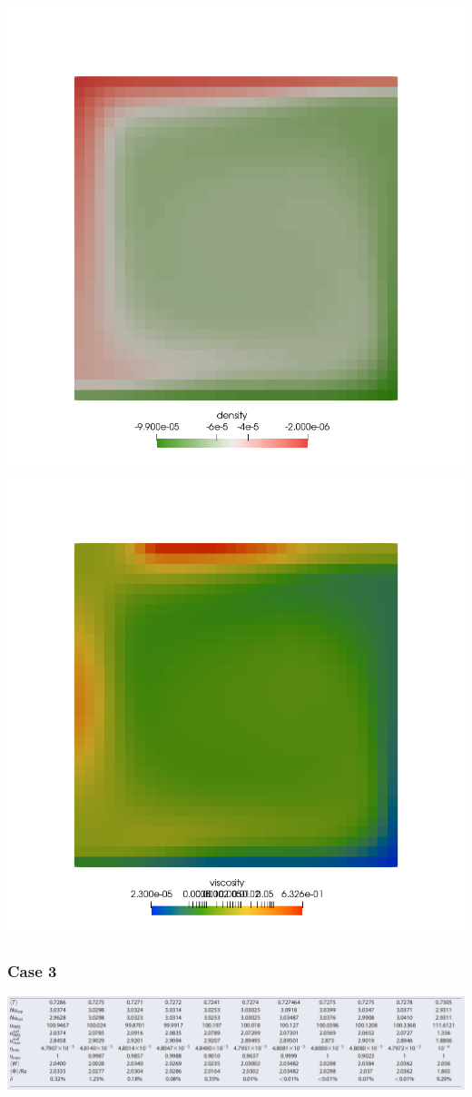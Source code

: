 \begin{center}
\includegraphics[width=7.cm]{python_codes/fieldstone_28/results_case2/rho}
\includegraphics[width=7.cm]{python_codes/fieldstone_28/results_case2/mueff}
\end{center}




\newpage %
\subsubsection*{Case 3}

\includegraphics[width=16cm]{python_codes/fieldstone_28/results_case3/tosn15}

